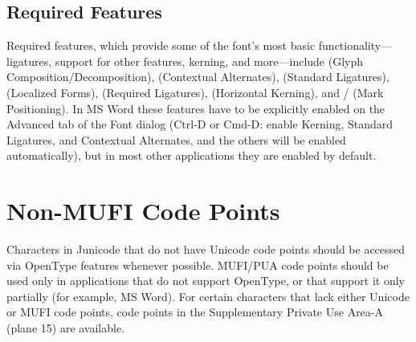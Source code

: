 \section{Required Features}
Required features, which provide some of the font’s most basic functionality---ligatures, support for
other features, kerning, and more---include  (Glyph Composition/Decomposition),
 (Contextual Alternates),  (Standard Ligatures),
 (Localized Forms),  (Required Ligatures),
 (Horizontal Kerning), and / (Mark
Positioning). In MS Word these features have to be explicitly enabled on the Advanced tab of the Font dialog (Ctrl-D or
Cmd-D: enable Kerning, Standard Ligatures, and Contextual Alternates, and the others will be enabled automatically),
but in most other applications they are enabled by default.


\chapter{Non-MUFI Code Points}\hypertarget{nonmufi}{}

Characters in Junicode that do not have Unicode code points should be accessed via OpenType
features whenever possible. MUFI/PUA code points should be used only in applications that do not support OpenType, or
that support it only partially (for example, MS Word). For certain characters that lack either Unicode or MUFI code
points, code points in the Supplementary Private Use Area-A (plane 15) are available.

